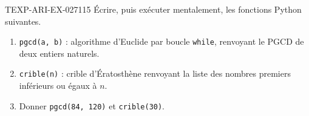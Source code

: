 % 
% 
% 
\begin{exercice}{TEXP-ARI-EX-027}{1}{15}
Écrire, puis exécuter mentalement, les fonctions Python suivantes.
\begin{enumerate}
  \item \texttt{pgcd(a, b)} : algorithme d'Euclide par boucle
        \texttt{while}, renvoyant le PGCD de deux entiers naturels.
  \item \texttt{crible(n)} : crible d'Ératosthène renvoyant la liste des
        nombres premiers inférieurs ou égaux à $n$.
  \item Donner \texttt{pgcd(84, 120)} et \texttt{crible(30)}.
\end{enumerate}
\end{exercice}
